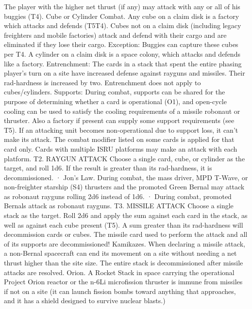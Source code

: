\documentclass[a4paper]{book}
\begin{document}
The player with the higher net thrust (if any) may attack with any or all of his buggies (T4).
Cube or Cylinder Combat. Any cube on a claim disk is a factory which attacks and defends (T5T4). Cubes not on a claim disk (including legacy freighters and mobile factories) attack and defend with their cargo and are eliminated if they lose their cargo. Exception: Buggies can capture these cubes per T4. A cylinder on a claim disk is a space colony, which attacks and defends like a factory.
Entrenchment: The cards in a stack that spent the entire phasing player’s turn on a site have increased defense against rayguns and missiles. Their rad-hardness is increased by two. Entrenchment does not apply to cubes/cylinders.
Supports: During combat, supports can be shared for the purpose of determining whether a card is operational (O1), and open-cycle cooling can be used to satisfy the cooling requirements of a missile robonaut or thruster. Also a factory if present can supply some support requirements (see T5). If an attacking unit becomes non-operational due to support loss, it can’t make its attack.
The combat modifier listed on some cards is applied for that card only.
Cards with multiple ISRU platforms may make an attack with each platform.
T2. RAYGUN ATTACK
Choose a single card, cube, or cylinder as the target, and roll 1d6. If the result is greater than its rad-hardness, it is decommissioned.
·       Jon’s Law. During combat, the mass driver, MPD T-Wave, or non-freighter starship (S4) thrusters and the promoted Green Bernal may attack as robonaut rayguns rolling 2d6 instead of 1d6.
·       During combat, promoted Bernals attack as robonaut rayguns.
T3. MISSILE ATTACK
Choose a single stack as the target. Roll 2d6 and apply the sum against each card in the stack, as well as against each cube present (T5). A sum greater than its rad-hardness will decommission cards or cubes. The missile card used to perform the attack and all of its supports are decommissioned!
Kamikazes. When declaring a missile attack, a non-Bernal spacecraft can end its movement on a site without needing a net thrust higher than the site size. The entire stack is decommissioned after missile attacks are resolved.
Orion. A Rocket Stack in space carrying the operational Project Orion reactor or the n-6Li microfission thruster is immune from missiles if not on a site (it can launch fission bombs toward anything that approaches, and it has a shield designed to survive nuclear blasts.)
\end{document}
